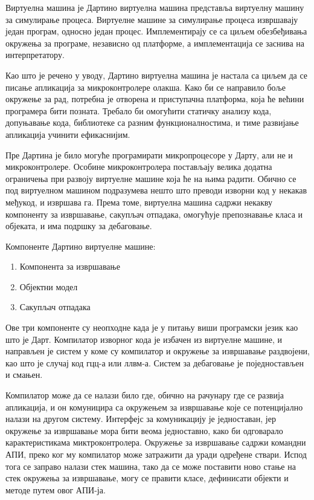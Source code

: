 \documentclass[12pt,oneside]{memoir}
\begin{document}
Виртуелна машина је 
Дартино виртуелна машина представља виртуелну машину за симулирање процеса. Виртуелне машине за симулирање процеса извршавају један програм, односно један процес. Имплементирају се са циљем обезбеђивања окружења за програме, независно од платформе, а имплементација се заснива на интерпретатору.

Као што је речено у уводу, Дартино виртуелна машина је настала са циљем да се писање апликација за микроконтролере олакша. Како би се направило боље окружење за рад, потребна је отворена и приступачна платформа, која ће већини програмера бити позната. Требало би омогућити статичку анализу кода, допуњавање кода, библиотеке са разним функционалностима, и тиме развијање апликација учинити ефикаснијим.

Пре Дартина је било могуће програмирати микропроцесоре у Дарту, али не и микроконтролере. Особине микроконтролера постављају велика додатна ограничења при развоју виртуелне машине која ће на њима радити. Обично се под виртуелном машином подразумева нешто што преводи изворни код у некакав међукод, и извршава га. Према томе, виртуелна машина садржи некакву компоненту за извршавање, сакупљач отпадака, омогућује препознавање класа и објеката, и има подршку за дебаговање.

Компоненте Дартино виртуелне машине:
\begin{enumerate}
\item Компонента за извршавање
\item Објектни модел
\item Сакупљач отпадака
\end{enumerate}

Ове три компоненте су неопходне када је у питању виши програмски језик као што је Дарт. Компилатор изворног кода је избачен из виртуелне машине, и направљен је систем у коме су компилатор и окружење за извршавање раздвојени, као што је случај код гцц-а или ллвм-а. Систем за дебаговање је поједностављен и смањен.

Компилатор може да се налази било где, обично на рачунару где се развија апликација, и он комуницира са окружењем за извршавање које се потенцијално налази на другом систему. Интерфејс за комуникацију је једноставан, јер окружење за извршавање мора бити веома једноставно, како би одговарало карактеристикама миктроконтролера.
Окружење за извршавање садржи командни АПИ, преко ког му компилатор може затражити да уради одређене ствари. Испод тога се заправо налази стек машина, тако да се може поставити ново стање на стек окружења за извршавање, могу се правити класе, дефинисати објекти и методе путем овог АПИ-ја.
\end{document}

